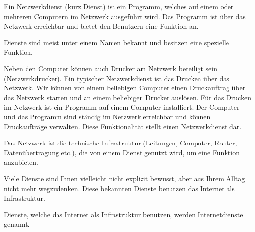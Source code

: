 \begin{definition}
Ein Netzwerkdienst (kurz Dienst) ist ein Programm, welches auf einem oder mehreren Computern im Netzwerk ausgeführt wird. Das Programm ist über das Netzwerk erreichbar und bietet den Benutzern eine Funktion an.
\end{definition}

Dienste sind meist unter einem Namen bekannt und besitzen eine spezielle Funktion.

\begin{example}[Druckservice]
Neben den Computer können auch Drucker am Netzwerk beteiligt sein (Netzwerkdrucker). Ein typischer Netzwerkdienst ist das Drucken über das Netzwerk. Wir können von einem beliebigen Computer einen Druckauftrag über das Netzwerk starten und an einem beliebigen Drucker auslösen. Für das Drucken im Netzwerk ist ein Programm auf einem Computer installiert. Der Computer und das Programm sind ständig im Netzwerk erreichbar und können Druckaufträge verwalten. Diese Funktionalität stellt einen Netzwerkdienst dar.
\end{example}


\begin{important}
Das Netzwerk ist die technische Infrastruktur (Leitungen, Computer, Router, Datenübertragung etc.), die von einem Dienst genutzt wird, um eine Funktion anzubieten.
\end{important}

Viele Dienste sind Ihnen vielleicht nicht explizit bewusst, aber aus Ihrem Alltag nicht mehr wegzudenken. Diese bekannten Dienste benutzen das Internet als Infrastruktur.

\begin{definition}
Dienste, welche das Internet als Infrastruktur benutzen, werden Internetdienste genannt.
\end{definition}


